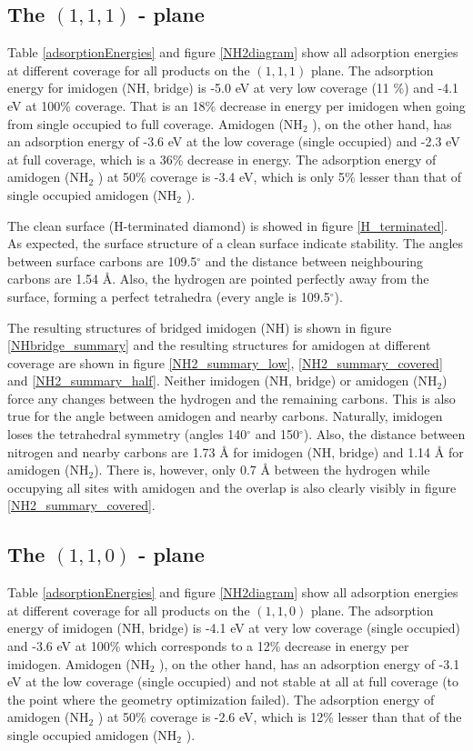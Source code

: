 \documentclass[10pt,a4paper]{article}
\begin{document}
\subsection{The $(1,  1, 1)$ - plane}
Table \ref{adsorptionEnergies} and figure \ref{NH2diagram} show all adsorption energies at different coverage for all products on the $(1,  1, 1)$ plane. The adsorption energy for imidogen (NH, bridge) is -5.0 eV at very low coverage (11 \%) and -4.1 eV at 100\% coverage. That is an 18\% decrease in energy per imidogen when going from single occupied to full coverage. Amidogen (NH$_2$ ), on the other hand, has an adsorption energy of -3.6 eV at the low coverage (single occupied) and -2.3 eV at full coverage, which is  a 36\% decrease in energy. The adsorption energy of amidogen (NH$_2$ ) at 50\% coverage is -3.4 eV, which is only 5\% lesser than that of single occupied amidogen (NH$_2$ ).

The clean surface (H-terminated diamond) is showed in figure \ref{H_terminated}. As expected, the surface structure of a clean surface indicate stability. The angles between surface carbons are 109.5$^{\circ}$ and the distance between neighbouring carbons are 1.54 Å. Also, the hydrogen are pointed perfectly away from the surface, forming a perfect tetrahedra (every angle is 109.5$^{\circ}$).

The resulting structures of bridged imidogen (NH) is shown in figure \ref{NHbridge_summary} and the resulting structures for amidogen at different coverage are shown in figure \ref{NH2_summary_low}, \ref{NH2_summary_covered} and \ref{NH2_summary_half}.  Neither imidogen (NH, bridge) or amidogen (NH$_2$) force any changes between the hydrogen and the remaining carbons. This is also true for the angle between amidogen and nearby carbons. Naturally, imidogen loses the tetrahedral symmetry (angles 140$^{\circ}$ and 150$^{\circ}$). Also, the distance between nitrogen and nearby carbons are 1.73 Å for imidogen (NH, bridge) and 1.14 Å for amidogen (NH$_2$). There is, however, only 0.7 Å between the hydrogen while occupying all sites with amidogen and the overlap is also clearly visibly in figure \ref{NH2_summary_covered}.

\subsection{The $(1,  1,  0)$ - plane}
Table \ref{adsorptionEnergies} and figure \ref{NH2diagram} show all adsorption energies at different coverage for all products on the $(1,  1,  0)$ plane. The adsorption energy of imidogen (NH, bridge) is -4.1 eV at very low coverage (single occupied) and -3.6 eV at 100\% which corresponds to a 12\% decrease in energy per imidogen. Amidogen (NH$_2$ ), on the other hand, has an adsorption energy of -3.1 eV at the low coverage (single occupied) and not stable at all at full coverage (to the point where the geometry optimization failed). The adsorption energy of amidogen (NH$_2$ ) at 50\% coverage is -2.6 eV, which is 12\% lesser than that of the single occupied amidogen (NH$_2$ ). 
\end{document}
